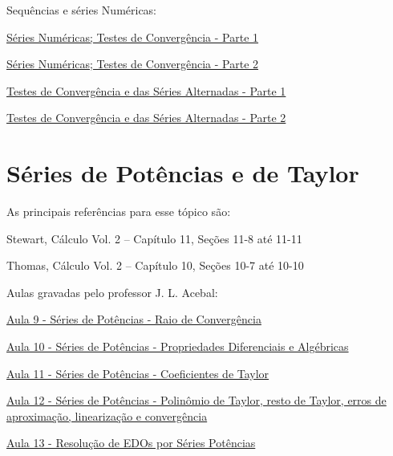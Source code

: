 Sequências e séries Numéricas:
\begin{listlinks}
  \item \href{https://www.youtube.com/watch?v=JiWKLACcRME&list=PLFBA21F349930F92F&index=38&t=0s}{Séries Numéricas; Testes de Convergência - Parte 1}
  \item \href{https://www.youtube.com/watch?v=AVUjsHZ9Um4&list=PLFBA21F349930F92F&index=39&t=0s}{Séries Numéricas; Testes de Convergência - Parte 2}
  \item \href{https://www.youtube.com/watch?v=W9BCFKULvaU&list=PLFBA21F349930F92F&index=40&t=0s}{Testes de Convergência e das Séries Alternadas - Parte 1}
  \item \href{https://www.youtube.com/watch?v=cb0apXI5SaM&list=PLFBA21F349930F92F&index=41&t=0s}{Testes de Convergência e das Séries Alternadas - Parte 2}
\end{listlinks}

\section{Séries de Potências e de Taylor}

As principais referências para esse tópico são:
\begin{listrefs}
  \item Stewart, Cálculo Vol. 2 \cite{stewart_2} -- Capítulo 11, Seções 11-8 até 11-11
  \item Thomas,  Cálculo Vol. 2 \cite{thomas_2}  -- Capítulo 10, Seções 10-7 até 10-10
\end{listrefs}

Aulas gravadas pelo professor J. L. Acebal:
\begin{listlinks}
  \item \href{https://youtu.be/ph9g86DY2Ng}{Aula  9 - Séries de Potências - Raio de Convergência}
  \item \href{https://youtu.be/uSZmRjUjXMc}{Aula 10 - Séries de Potências - Propriedades Diferenciais e Algébricas}
  \item \href{https://youtu.be/W68BrWELpLw}{Aula 11 - Séries de Potências - Coeficientes de Taylor}
  \item \href{https://youtu.be/i5gxxsaRSdk}{Aula 12 - Séries de Potências - Polinômio de Taylor, resto de Taylor, erros de aproximação, linearização e convergência}
  \item \href{https://youtu.be/LCR2unh7zLU}{Aula 13 - Resolução de EDOs por Séries Potências}
\end{listlinks}


